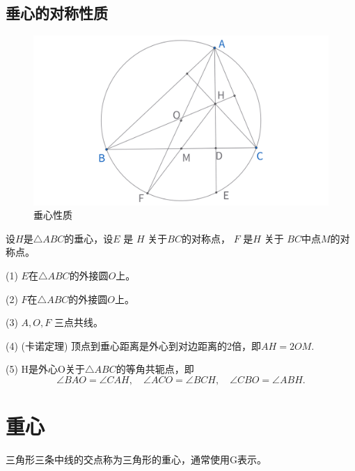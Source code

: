 \newpage 
\subsection{垂心的对称性质}
\begin{figure}[H]
    \centering
    \includegraphics[width=0.8\linewidth]{figures/三角形五心/垂心的对称性质.png}
    \caption{垂心性质}
\end{figure}

\begin{theorem}[垂心的对称性质]
    设$H$是$\triangle ABC$的垂心，设$E$ 是 $H$ 关于$BC$的对称点， $F$ 是$H$ 关于 $BC$中点$M$的对称点。

    (1) $E$在$\triangle ABC$的外接圆$O$上。


    (2) $F$在$\triangle ABC$的外接圆$O$上。

    (3) $A, O, F$ 三点共线。

    (4) (卡诺定理) 顶点到垂心距离是外心到对边距离的2倍，即$AH = 2OM.$
   
    (5) H是外心O关于$\triangle ABC$的等角共轭点，即
    $$\angle BAO = \angle CAH, \quad 
    \angle ACO = \angle BCH, \quad 
    \angle CBO = \angle ABH.$$
\end{theorem}



\newpage
\section{重心}
\begin{definition}[重心]
    三角形三条中线的交点称为三角形的重心，通常使用G表示。
\end{definition}

